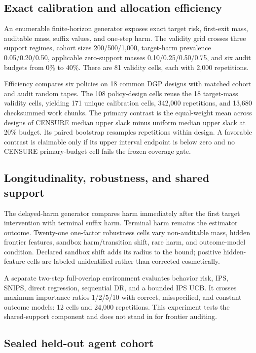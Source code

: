 \documentclass{article}
\begin{document}
\subsection{Exact calibration and allocation efficiency}

An enumerable finite-horizon generator exposes exact target risk, first-exit mass, auditable mass,
suffix values, and one-step harm. The validity grid crosses three support regimes, cohort sizes
200/500/1,000, target-harm prevalence 0.05/0.20/0.50, applicable zero-support masses
0.10/0.25/0.50/0.75, and six audit budgets from 0\% to 40\%. There are 81 validity cells, each with
2,000 repetitions.

Efficiency compares six policies on 18 common DGP designs with matched cohort and audit random
tapes. The 108 policy-design cells reuse the 18 target-mass validity cells, yielding 171 unique
calibration cells, 342,000 repetitions, and 13,680 checksummed work chunks. The primary contrast is
the equal-weight mean across designs of CENSURE median upper slack minus uniform median upper slack
at 20\% budget. Its paired bootstrap resamples repetitions within design. A favorable contrast is
claimable only if its upper interval endpoint is below zero and no CENSURE primary-budget cell
fails the frozen coverage gate.

\subsection{Longitudinality, robustness, and shared support}

The delayed-harm generator compares harm immediately after the first target intervention with
terminal suffix harm. Terminal harm remains the estimator outcome. Twenty-one one-factor
robustness cells vary non-auditable mass, hidden frontier features, sandbox harm/transition shift,
rare harm, and outcome-model condition. Declared sandbox shift adds its radius to the bound;
positive hidden-feature cells are labeled unidentified rather than corrected cosmetically.

A separate two-step full-overlap environment evaluates behavior risk, IPS, SNIPS, direct
regression, sequential DR, and a bounded IPS UCB. It crosses maximum importance ratios
1/2/5/10 with correct, misspecified, and constant outcome models: 12 cells and 24,000 repetitions.
This experiment tests the shared-support component and does not stand in for frontier auditing.

\subsection{Sealed held-out agent cohort}
\end{document}

